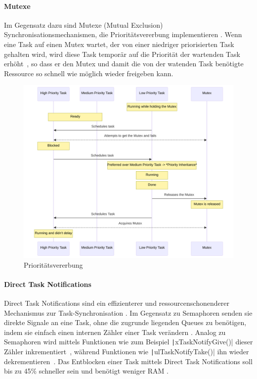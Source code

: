 \paragraph{Mutexe} \label{sec:mutex}

Im Gegensatz dazu sind Mutexe (Mutual Exclusion) Synchronisationsmechanismen,
die Prioritätsvererbung implementieren \cite{freertos_mutexes}. Wenn eine Task
auf einen Mutex wartet, der von einer niedriger priorisierten Task gehalten
wird, wird diese Task temporär auf die Priorität der wartenden Task
erhöht~\cite{FreertosForumSemphMtx}, so dass er den Mutex und damit die von der
watenden Task benötigte Ressource so schnell wie möglich wieder freigeben kann.

\begin{figure}[htb]
    \centering
    \includegraphics[width=1\textwidth]{assets/prio_inheritance}
    \caption{Prioritätsvererbung}
\end{figure}

\paragraph{Direct Task Notifications} \label{sec:direct_task_notification}

Direct Task Notifications sind ein effizienterer und ressourcenschonenderer
Mechanismus zur Task-Synchronisation \cite{freertos_task_notifications_desc}. Im
Gegensatz zu Semaphoren senden sie direkte Signale an eine Task, ohne die
zugrunde liegenden Queues zu benötigen, indem sie einfach einen internen Zähler
einer Task verändern \cite{freertos_tasks_c_308}. Analog zu Semaphoren wird
mittels Funktionen wie zum Beispiel \texttt|xTaskNotifyGive()| dieser
Zähler inkrementiert~\cite{freertos_tasks_c_4990}, während Funktionen wie
\texttt|ulTaskNotifyTake()| ihn wieder
dekrementieren~\cite{freertos_tasks_c_4614}. Das Entblocken einer Task mittels
Direct Task Notifications soll bis zu 45\% schneller sein und benötigt weniger
RAM \cite{freertos_task_notifications_usage}.


